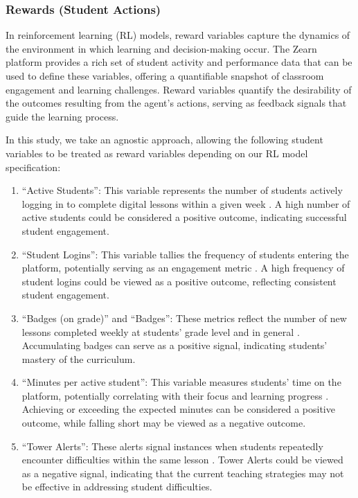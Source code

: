 \documentclass[
  number,
  preprint,
  3p,
  onecolumn]{elsarticle}
\begin{document}
\subsubsection{Rewards (Student Actions)}\label{rewards-student-actions}

In reinforcement learning (RL) models, reward variables capture the
dynamics of the environment in which learning and decision-making occur.
The Zearn platform provides a rich set of student activity and
performance data that can be used to define these variables, offering a
quantifiable snapshot of classroom engagement and learning challenges.
Reward variables quantify the desirability of the outcomes resulting
from the agent's actions, serving as feedback signals that guide the
learning process.

In this study, we take an agnostic approach, allowing the following
student variables to be treated as reward variables depending on our RL
model specification:

\begin{enumerate}
\def\labelenumi{\arabic{enumi}.}
\item
  ``Active Students'': This variable represents the number of students
  actively logging in to complete digital lessons within a given week
  \citep{zearn2022}. A high number of active students could be
  considered a positive outcome, indicating successful student
  engagement.
\item
  ``Student Logins'': This variable tallies the frequency of students
  entering the platform, potentially serving as an engagement metric
  \citep{zearn2024}. A high frequency of student logins could be viewed
  as a positive outcome, reflecting consistent student engagement.
\item
  ``Badges (on grade)'' and ``Badges'': These metrics reflect the number
  of new lessons completed weekly at students' grade level and in
  general \citep{zearn2024a}. Accumulating badges can serve as a
  positive signal, indicating students' mastery of the curriculum.
\item
  ``Minutes per active student'': This variable measures students' time
  on the platform, potentially correlating with their focus and learning
  progress \citep{zearn2022}. Achieving or exceeding the expected
  minutes can be considered a positive outcome, while falling short may
  be viewed as a negative outcome.
\item
  ``Tower Alerts'': These alerts signal instances when students
  repeatedly encounter difficulties within the same lesson
  \citep{zearn2024b}. Tower Alerts could be viewed as a negative signal,
  indicating that the current teaching strategies may not be effective
  in addressing student difficulties.
\end{enumerate}
\end{document}
